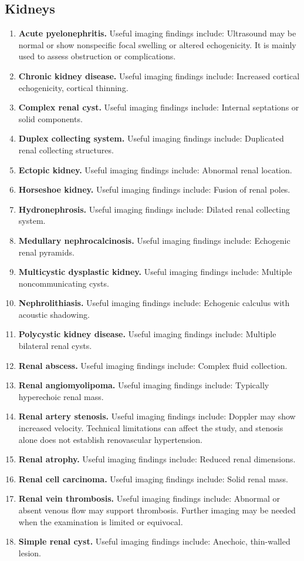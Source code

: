 \subsection{Kidneys}
\begin{enumerate}[leftmargin=*,itemsep=0.45em,topsep=0.4em]
\item \textbf{Acute pyelonephritis.} Useful imaging findings include: Ultrasound may be normal or show nonspecific focal swelling or altered echogenicity. It is mainly used to assess obstruction or complications.
\item \textbf{Chronic kidney disease.} Useful imaging findings include: Increased cortical echogenicity, cortical thinning.
\item \textbf{Complex renal cyst.} Useful imaging findings include: Internal septations or solid components.
\item \textbf{Duplex collecting system.} Useful imaging findings include: Duplicated renal collecting structures.
\item \textbf{Ectopic kidney.} Useful imaging findings include: Abnormal renal location.
\item \textbf{Horseshoe kidney.} Useful imaging findings include: Fusion of renal poles.
\item \textbf{Hydronephrosis.} Useful imaging findings include: Dilated renal collecting system.
\item \textbf{Medullary nephrocalcinosis.} Useful imaging findings include: Echogenic renal pyramids.
\item \textbf{Multicystic dysplastic kidney.} Useful imaging findings include: Multiple noncommunicating cysts.
\item \textbf{Nephrolithiasis.} Useful imaging findings include: Echogenic calculus with acoustic shadowing.
\item \textbf{Polycystic kidney disease.} Useful imaging findings include: Multiple bilateral renal cysts.
\item \textbf{Renal abscess.} Useful imaging findings include: Complex fluid collection.
\item \textbf{Renal angiomyolipoma.} Useful imaging findings include: Typically hyperechoic renal mass.
\item \textbf{Renal artery stenosis.} Useful imaging findings include: Doppler may show increased velocity. Technical limitations can affect the study, and stenosis alone does not establish renovascular hypertension.
\item \textbf{Renal atrophy.} Useful imaging findings include: Reduced renal dimensions.
\item \textbf{Renal cell carcinoma.} Useful imaging findings include: Solid renal mass.
\item \textbf{Renal vein thrombosis.} Useful imaging findings include: Abnormal or absent venous flow may support thrombosis. Further imaging may be needed when the examination is limited or equivocal.
\item \textbf{Simple renal cyst.} Useful imaging findings include: Anechoic, thin-walled lesion.
\end{enumerate}

